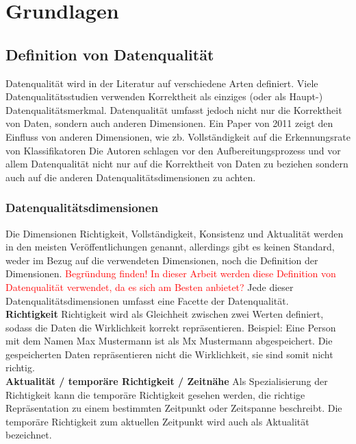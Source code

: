 \chapter{Grundlagen}\label{ch:data}

\section{Definition von Datenqualität}
Datenqualität wird in der Literatur auf verschiedene Arten definiert. 
Viele Datenqualitätsstudien verwenden Korrektheit als einziges (oder als Haupt-) Datenqualitätsmerkmal. \cite{wang1996}
Datenqualität umfasst jedoch nicht nur die Korrektheit von Daten, sondern auch anderen Dimensionen. 
Ein Paper von 2011 zeigt den Einfluss von anderen Dimensionen, wie zb. Vollständigkeit auf die Erkennungsrate von Klassifikatoren \cite{espinosaoliva2011} Die Autoren schlagen vor den Aufbereitungsprozess und vor allem Datenqualität nicht nur auf die Korrektheit von Daten zu beziehen sondern auch auf die anderen Datenqualitätsdimensionen zu achten.

\subsection{Datenqualitätsdimensionen}
Die Dimensionen Richtigkeit, Vollständigkeit, Konsistenz und Aktualität werden in den meisten Veröffentlichungen genannt, allerdings gibt es keinen Standard, weder im Bezug auf die verwendeten Dimensionen, noch die Definition der Dimensionen. \cite{scannapieco2002}
\textcolor{red}{Begründung finden! In dieser Arbeit werden diese Definition von Datenqualität verwendet, da es sich am Besten anbietet?}
Jede dieser Datenqualitätsdimensionen umfasst eine Facette der Datenqualität.
\\ \textbf{Richtigkeit}
Richtigkeit wird als Gleichheit zwischen zwei Werten definiert, sodass die Daten die Wirklichkeit korrekt repräsentieren. 
Beispiel: Eine Person mit dem Namen Max Mustermann ist als Mx Mustermann abgespeichert. 
Die gespeicherten Daten repräsentieren nicht die Wirklichkeit, sie sind somit nicht richtig.
\\ \textbf{Aktualität / temporäre Richtigkeit / Zeitnähe}
Als Spezialisierung der Richtigkeit kann die temporäre Richtigkeit gesehen werden, die richtige Repräsentation zu einem bestimmten Zeitpunkt oder Zeitspanne beschreibt. 
Die temporäre Richtigkeit zum aktuellen Zeitpunkt wird auch als Aktualität bezeichnet. 

